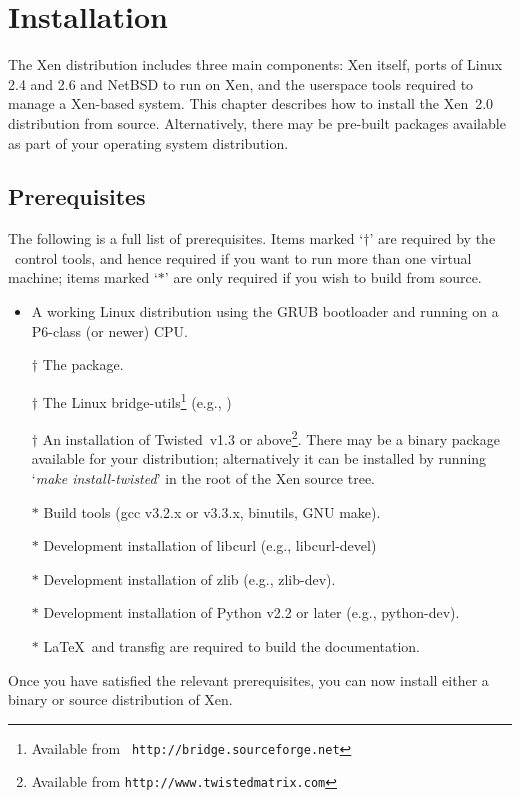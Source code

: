 \chapter{Installation}

The Xen distribution includes three main components: Xen itself, ports
of Linux 2.4 and 2.6 and NetBSD to run on Xen, and the userspace
tools required to manage a Xen-based system.  This chapter describes
how to install the Xen~2.0 distribution from source.  Alternatively,
there may be pre-built packages available as part of your operating
system distribution.


\section{Prerequisites}
\label{sec:prerequisites}

The following is a full list of prerequisites.  Items marked `$\dag$'
are required by the \xend\ control tools, and hence required if you
want to run more than one virtual machine; items marked `$*$' are only
required if you wish to build from source.
\begin{itemize}
\item A working Linux distribution using the GRUB bootloader and
  running on a P6-class (or newer) CPU.
\item [$\dag$] The  package.
\item [$\dag$] The Linux bridge-utils\footnote{Available from {\tt
      http://bridge.sourceforge.net}} (e.g., )
\item [$\dag$] An installation of Twisted~v1.3 or
  above\footnote{Available from {\tt http://www.twistedmatrix.com}}.
  There may be a binary package available for your distribution;
  alternatively it can be installed by running `{\sl make
    install-twisted}' in the root of the Xen source tree.
\item [$*$] Build tools (gcc v3.2.x or v3.3.x, binutils, GNU make).
\item [$*$] Development installation of libcurl (e.g., libcurl-devel)
\item [$*$] Development installation of zlib (e.g., zlib-dev).
\item [$*$] Development installation of Python v2.2 or later (e.g.,
  python-dev).
\item [$*$] \LaTeX\ and transfig are required to build the
  documentation.
\end{itemize}

Once you have satisfied the relevant prerequisites, you can now
install either a binary or source distribution of Xen.


